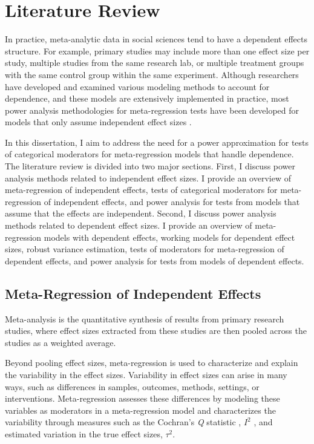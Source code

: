 \chapter{Literature Review}\label{ch:literaturereview}

In practice, meta-analytic data in social sciences tend to have a dependent effects structure. For example, primary studies may include more than one effect size per study, multiple studies from the same research lab, or multiple treatment groups with the same control group within the same experiment. Although researchers have developed and examined various modeling methods to account for dependence, and these models are extensively implemented in practice, most power analysis methodologies for meta-regression tests have been developed for models that only assume independent effect sizes \autocite{hedges2001, hedges2004, jackson2017}.

In this dissertation, I aim to address the need for a power approximation for tests of categorical moderators for meta-regression models that handle dependence. The literature review is divided into two major sections. First, I discuss power analysis methods related to independent effect sizes. I provide an overview of meta-regression of independent effects, tests of categorical moderators for meta-regression of independent effects, and power analysis for tests from models that assume that the effects are independent. Second, I discuss power analysis methods related to dependent effect sizes. I provide an overview of meta-regression models with dependent effects, working models for dependent effect sizes, robust variance estimation, tests of moderators for meta-regression of dependent effects, and power analysis for tests from models of dependent effects. 

\section{Meta-Regression of Independent Effects}
Meta-analysis is the quantitative synthesis of results from primary research studies, where effect sizes \autocite[e.g., standardized mean differences, correlation, odds ratio, etc.;][]{cooper2019} extracted from these studies are then pooled across the studies as a weighted average. 

Beyond pooling effect sizes, meta-regression is used to characterize and explain the variability in the effect sizes. Variability in effect sizes can arise in many ways, such as differences in samples, outcomes, methods, settings, or interventions. Meta-regression assesses these differences by modeling these variables as moderators in a meta-regression model and characterizes the variability through measures such as the Cochran's \emph{Q} statistic \autocite{cochran1954,cooper2019}, $I^2$ \autocite{higgins2002}, and estimated variation in the true effect sizes, $\tau^2$. 

